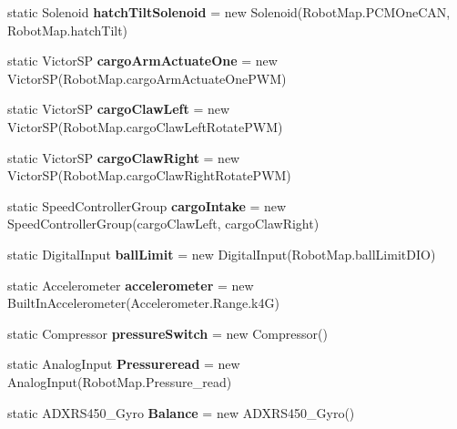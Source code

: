 \begin{DoxyCompactItemize}
\item 
\mbox{\label{classfrc_1_1robot_1_1_o_i_aa8cdb6b236dfb9fead12621b4f42c274}} 
static Solenoid {\bfseries hatch\+Tilt\+Solenoid} = new Solenoid(Robot\+Map.\+P\+C\+M\+One\+C\+AN, Robot\+Map.\+hatch\+Tilt)
\item 
\mbox{\label{classfrc_1_1robot_1_1_o_i_aeee9fe6efef4ea8f2558ccd2de43e71a}} 
static Victor\+SP {\bfseries cargo\+Arm\+Actuate\+One} = new Victor\+SP(Robot\+Map.\+cargo\+Arm\+Actuate\+One\+P\+WM)
\item 
\mbox{\label{classfrc_1_1robot_1_1_o_i_a7ec725773fd1bb5dc4263980a232e75f}} 
static Victor\+SP {\bfseries cargo\+Claw\+Left} = new Victor\+SP(Robot\+Map.\+cargo\+Claw\+Left\+Rotate\+P\+WM)
\item 
\mbox{\label{classfrc_1_1robot_1_1_o_i_a32fd81c9a712924aa42a9eb74f278df1}} 
static Victor\+SP {\bfseries cargo\+Claw\+Right} = new Victor\+SP(Robot\+Map.\+cargo\+Claw\+Right\+Rotate\+P\+WM)
\item 
\mbox{\label{classfrc_1_1robot_1_1_o_i_a40d2adcc988805032885ba668fc6f86f}} 
static Speed\+Controller\+Group {\bfseries cargo\+Intake} = new Speed\+Controller\+Group(cargo\+Claw\+Left, cargo\+Claw\+Right)
\item 
\mbox{\label{classfrc_1_1robot_1_1_o_i_aebf7c01734a48f269b40f7b1f1125f10}} 
static Digital\+Input {\bfseries ball\+Limit} = new Digital\+Input(Robot\+Map.\+ball\+Limit\+D\+IO)
\item 
\mbox{\label{classfrc_1_1robot_1_1_o_i_a57e609e018f3013d5beb8bffa5771df0}} 
static Accelerometer {\bfseries accelerometer} = new Built\+In\+Accelerometer(Accelerometer.\+Range.\+k4G)
\item 
\mbox{\label{classfrc_1_1robot_1_1_o_i_a68157a4a30cc0fae8bc36ae0ac999c82}} 
static Compressor {\bfseries pressure\+Switch} = new Compressor()
\item 
\mbox{\label{classfrc_1_1robot_1_1_o_i_a763d5acad9b29d4b29b0fff838059571}} 
static Analog\+Input {\bfseries Pressureread} = new Analog\+Input(Robot\+Map.\+Pressure\+\_\+read)
\item 
\mbox{\label{classfrc_1_1robot_1_1_o_i_a951d7ff102fca8319e5a9401a0f2214b}} 
static A\+D\+X\+R\+S450\+\_\+\+Gyro {\bfseries Balance} = new A\+D\+X\+R\+S450\+\_\+\+Gyro()
\end{DoxyCompactItemize}


